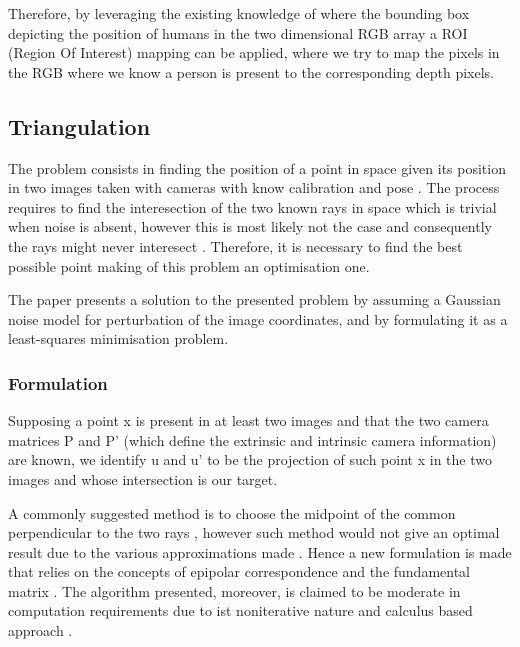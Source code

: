 Therefore, by leveraging the existing knowledge of where the bounding box depicting the position of humans in the two dimensional RGB array a ROI (Region Of Interest) mapping can be applied, where we try to map the pixels in the RGB where we know a person is present to the corresponding depth pixels.

\subsection{Triangulation}

The problem consists in finding the position of a point in space given its position in two images taken with cameras with know calibration and pose \cite{hartley1997triangulation}. The process requires to find the interesection of the two known rays in space which is trivial when noise is absent, however this is most likely not the case and consequently the rays might never interesect \cite{hartley1997triangulation}. Therefore, it is necessary to find the best possible point \cite{hartley1997triangulation} making of this problem an optimisation one.

The paper presents a solution to the presented problem by assuming a Gaussian noise model for perturbation of the image coordinates, and by formulating it as a least-squares minimisation problem.

\subsubsection{Formulation}

Supposing a point x is present in at least two images and that the two camera matrices P and P' (which define the extrinsic and intrinsic camera information) are known, we identify u and u' to be the projection of such point x in the two images \cite{hartley1997triangulation} and whose intersection is our target.

A commonly suggested method is to choose the midpoint of the common perpendicular to the two rays \cite{hartley1997triangulation}, however such method would not give an optimal result due to the various approximations made \cite{hartley1997triangulation}. Hence a new formulation is made that relies on the concepts of epipolar correspondence and the fundamental matrix \cite{hartley1997triangulation}. The algorithm presented, moreover, is claimed to be moderate in computation requirements due to ist noniterative nature and calculus based approach \cite{hartley1997triangulation}.

